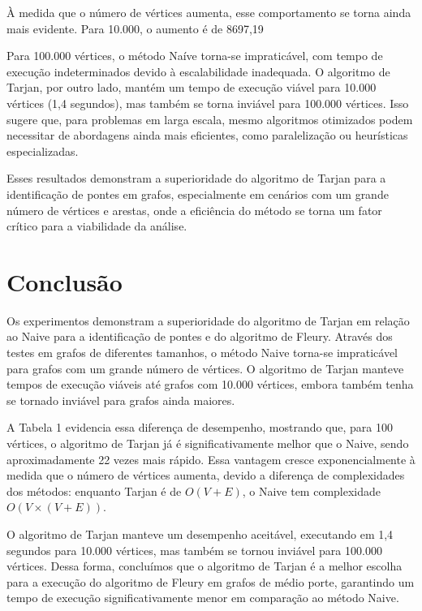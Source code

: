 \documentclass{article}
\begin{document}
À medida que o número de vértices aumenta, esse comportamento se torna ainda mais evidente. Para 10.000, o aumento é de 8697,19%

Para 100.000 vértices, o método Naíve torna-se impraticável, com tempo de execução indeterminados devido à escalabilidade inadequada. O algoritmo de Tarjan, por outro lado, mantém um tempo de execução viável para 10.000 vértices (1,4 segundos), mas também se torna inviável para 100.000 vértices. Isso sugere que, para problemas em larga escala, mesmo algoritmos otimizados podem necessitar de abordagens ainda mais eficientes, como paralelização ou heurísticas especializadas.

Esses resultados demonstram a superioridade do algoritmo de Tarjan para a identificação de pontes em grafos, especialmente em cenários com um grande número de vértices e arestas, onde a eficiência do método se torna um fator crítico para a viabilidade da análise.

\section{Conclus\~ao}
Os experimentos demonstram a superioridade do algoritmo de Tarjan em relação ao Naive para a identificação de pontes e do algoritmo de Fleury. Através dos testes em grafos de diferentes tamanhos, o método Naive torna-se impraticável para grafos com um grande número de vértices. O algoritmo de Tarjan manteve tempos de execução viáveis até grafos com 10.000 vértices, embora também tenha se tornado inviável para grafos ainda maiores.

A Tabela 1 evidencia essa diferença de desempenho, mostrando que, para 100 vértices, o algoritmo de Tarjan já é significativamente melhor que o Naive, sendo aproximadamente 22 vezes mais rápido. Essa vantagem cresce exponencialmente à medida que o número de vértices aumenta, devido a diferença de complexidades dos métodos: enquanto Tarjan é de $O(V + E)$, o Naive tem complexidade $O(V \times (V + E))$.

O algoritmo de Tarjan manteve um desempenho aceitável, executando em 1,4 segundos para 10.000 vértices, mas também se tornou inviável para 100.000 vértices. Dessa forma, concluímos que o algoritmo de Tarjan é a melhor escolha para a execução do algoritmo de Fleury em grafos de médio porte, garantindo um tempo de execução significativamente menor em comparação ao método Naive.
\end{document}
